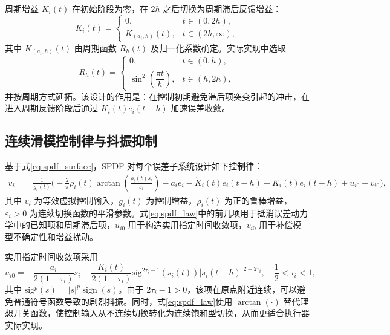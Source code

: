 周期增益 $K_i(t)$ 在初始阶段为零，在 $2h$ 之后切换为周期滞后反馈增益：
\begin{equation}
K_i(t)=
\begin{cases}
0, & t\in(0,2h),\\
K_{(a_i,h)}(t), & t\in(2h,\infty),
\end{cases}
\label{eq:spdf_gain}
\end{equation}
其中 $K_{(a_i,h)}(t)$ 由周期函数 $R_h(t)$ 及归一化系数确定。实际实现中选取
\begin{equation}
R_h(t)=
\begin{cases}
0, & t\in(0,h),\\
\sin^2\left(\dfrac{\pi t}{h}\right), & t\in(h,2h),
\end{cases}
\end{equation}
并按周期方式延拓。该设计的作用是：在控制初期避免滞后项突变引起的冲击，在进入周期反馈阶段后通过 $K_i(t)e_i(t-h)$ 加速误差收敛。

\subsection{连续滑模控制律与抖振抑制}
基于式\eqref{eq:spdf_surface}，SPDF 对每个误差子系统设计如下控制律：
\begin{equation}
\begin{aligned}
v_i={}&\frac{1}{g_i(t)}
\Bigg(
-\frac{2}{\pi}\rho_i(t)\arctan\left(\frac{\rho_i(t)s_i}{\varepsilon_i}\right)
-a_i\dot e_i -\dot K_i(t)e_i(t-h)-K_i(t)\dot e_i(t-h)
+u_{i0}+v_{i0}
\Bigg),
\end{aligned}
\label{eq:spdf_law}
\end{equation}
其中 $v_i$ 为等效虚拟控制输入，$g_i(t)$ 为控制增益，$\rho_i(t)$ 为正的鲁棒增益，$\varepsilon_i>0$ 为连续切换函数的平滑参数。式\eqref{eq:spdf_law}中的前几项用于抵消误差动力学中的已知项和周期滞后项，$u_{i0}$ 用于构造实用指定时间收敛项，$v_{i0}$ 用于补偿模型不确定性和增益扰动。

实用指定时间收敛项采用
\begin{equation}
u_{i0}=-\frac{a_i}{2(1-\tau_i)}s_i
-\frac{K_i(t)}{2(1-\tau_i)}
\mathrm{sig}^{2\tau_i-1}(s_i(t))|s_i(t-h)|^{2-2\tau_i},
\quad \frac{1}{2}<\tau_i<1,
\label{eq:spdf_u0}
\end{equation}
其中 $\mathrm{sig}^{p}(s)=|s|^p\operatorname{sign}(s)$。由于 $2\tau_i-1>0$，该项在原点附近连续，可以避免普通符号函数导致的剧烈抖振。同时，式\eqref{eq:spdf_law}使用 $\arctan(\cdot)$ 替代理想开关函数，使控制输入从不连续切换转化为连续饱和型切换，从而更适合执行器实际实现。

